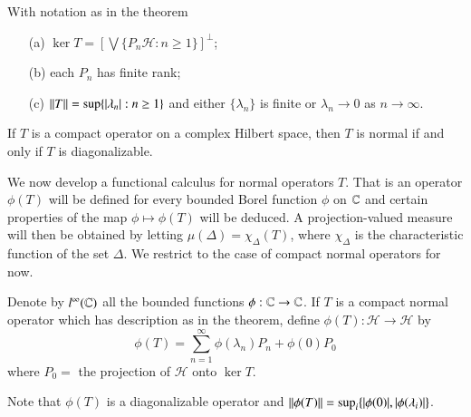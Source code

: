 \begin{cor}
    With notation as in the theorem \begin{enumerate}
        \item[(a)] $\ker T = \left[\bigvee\{P_n\mathscr{H}:n\geq 1\}\right]^{\perp}$;
        \item[(b)] each $P_n$ has finite rank;
        \item[(c)] $\left|\left| T\right|\right| = \sup\{|\lambda_n|:n\geq 1\}$ and either $\{\lambda_n\}$ is finite or $\lambda_n\rightarrow 0$ as $n\rightarrow \infty$.
    \end{enumerate}
\end{cor}

\begin{cor}
    If $T$ is a compact operator on a complex Hilbert space, then $T$ is normal if and only if $T$ is diagonalizable.
\end{cor}

We now develop a functional calculus for normal operators $T$. That is an operator $\phi(T)$ will be defined for every bounded Borel function $\phi$ on $\mathbb C$ and certain properties of the map $\phi\mapsto \phi(T)$ will be deduced. A projection-valued measure will then be obtained by letting $\mu(\Delta) = \chi_{\Delta}(T)$, where $\chi_{\Delta}$ is the characteristic function of the set $\Delta$. We restrict to the case of compact normal operators for now.

\begin{defn}
    Denote by $l^{\infty}(\mathbb C)$ all the bounded functions $\phi:\mathbb C\rightarrow \mathbb C$. If $T$ is a compact normal operator which has description as in the theorem, define $\phi(T):\mathscr{H}\rightarrow \mathscr{H}$ by $$\phi(T) = \sum_{n=1}^{\infty}\phi(\lambda_n)P_n+\phi(0)P_0$$
    where $P_0 =$ the projection of $\mathscr{H}$ onto $\ker T$.
\end{defn}

Note that $\phi(T)$ is a diagonalizable operator and $\left|\left| \phi(T)\right|\right| = \sup_i\{|\phi(0)|,|\phi(\lambda_i)|\}$.

